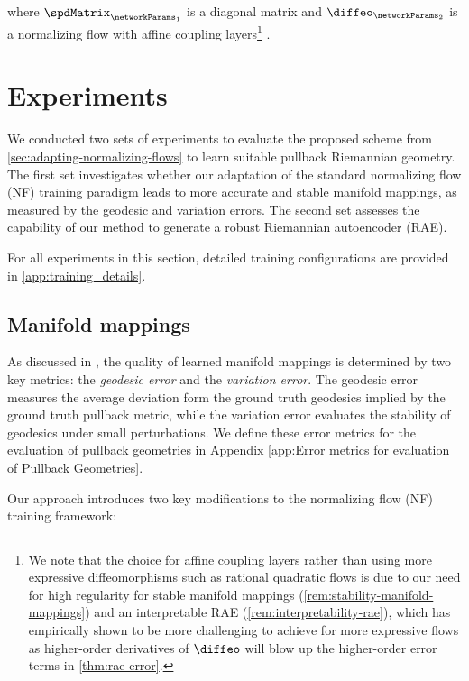 where $\spdMatrix_{\networkParams_1}$ is a diagonal matrix and $\diffeo_{\networkParams_2}$ is a normalizing flow with affine coupling layers\footnote{We note that the choice for affine coupling layers rather than using more expressive diffeomorphisms such as rational quadratic flows \cite{durkan2019neural} is due to our need for high regularity for stable manifold mappings (\ref{rem:stability-manifold-mappings}) and an interpretable RAE (\ref{rem:interpretability-rae}), which has empirically shown to be more challenging to achieve for more expressive flows as higher-order derivatives of $\diffeo$ will blow up the higher-order error terms in \ref{thm:rae-error}.} \cite{dinh2017density}.


\section{Experiments}
\label{sec:numerics}

We conducted two sets of experiments to evaluate the proposed scheme from \ref{sec:adapting-normalizing-flows} to learn suitable pullback Riemannian geometry. The first set investigates whether our adaptation of the standard normalizing flow (NF) training paradigm leads to more accurate and stable manifold mappings, as measured by the geodesic and variation errors. The second set assesses the capability of our method to generate a robust Riemannian autoencoder (RAE).

For all experiments in this section, detailed training configurations are provided in \ref{app:training_details}.

\subsection{Manifold mappings}
\label{sec:manifold-mappings-experiments}

As discussed in \cite{diepeveen2024pulling}, the quality of learned manifold mappings is determined by two key metrics: the \emph{geodesic error} and the \emph{variation error}. The geodesic error measures the average deviation form the ground truth geodesics implied by the ground truth pullback metric, while the variation error evaluates the stability of geodesics under small perturbations. We define these error metrics for the evaluation of pullback geometries in Appendix \ref{app:Error metrics for evaluation of Pullback Geometries}.

Our approach introduces two key modifications to the normalizing flow (NF) training framework:

